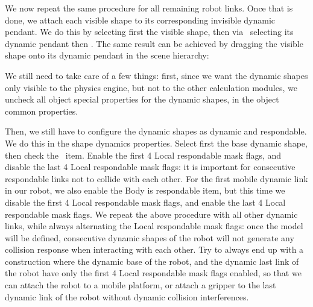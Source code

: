 
We now repeat the same procedure for all remaining robot links. Once that is 
done, we attach each visible shape to its corresponding invisible dynamic
pendant. We do this by selecting first the visible shape, then via
\ selecting its dynamic pendant then
. The same result can be 
achieved by dragging the visible shape onto its dynamic pendant in the scene
hierarchy:


We still need to take care of a few things: first, since we want the dynamic 
shapes only visible to the physics engine, but not to the other calculation 
modules, we uncheck all object special properties for the dynamic shapes, in 
the object common properties.

Then, we still have to configure the dynamic shapes as dynamic and respondable. 
We do this in the shape dynamics properties. Select first the base dynamic 
shape, then check the \ item. Enable the first 4 Local respondable mask flags, and 
disable the last 4 Local respondable mask flags: it is important for 
consecutive respondable links not to collide with each other. For the first 
mobile dynamic link in our robot, 
we also enable the 
Body is respondable item, but this time we disable the first 4 Local 
respondable mask flags, and enable the last 4 Local respondable mask flags. 
We repeat the above procedure with all other dynamic links, while always 
alternating the Local respondable mask flags: once the model will be defined,
consecutive dynamic shapes of the robot will not generate any collision
response when interacting with each other. Try to always end up with a
construction where the dynamic base of the robot, and the dynamic last link 
of the robot have only the first 4 Local respondable mask flags enabled, so 
that we can attach the robot to a mobile platform, or attach a gripper to the
last dynamic link of the robot without dynamic collision interferences.

